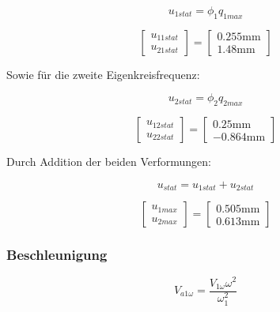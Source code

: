 \documentclass[
  letterpaper,
  DIV=11]{scrreprt}
\begin{document}
\begin{equation*}u_{1 stat} = \phi_{1} q_{1 max}\end{equation*}

\begin{equation*}\left[\begin{matrix}u_{11stat}\\u_{21stat}\end{matrix}\right] = \left[\begin{matrix}0.255 \text{mm}\\1.48 \text{mm}\end{matrix}\right]\end{equation*}

Sowie für die zweite Eigenkreisfrequenz:

\begin{equation*}u_{2 stat} = \phi_{2} q_{2 max}\end{equation*}

\begin{equation*}\left[\begin{matrix}u_{12stat}\\u_{22stat}\end{matrix}\right] = \left[\begin{matrix}0.25 \text{mm}\\- 0.864 \text{mm}\end{matrix}\right]\end{equation*}

Durch Addition der beiden Verformungen:

\begin{equation*}u_{stat} = u_{1 stat} + u_{2 stat}\end{equation*}

\begin{equation*}\left[\begin{matrix}u_{1max}\\u_{2max}\end{matrix}\right] = \left[\begin{matrix}0.505 \text{mm}\\0.613 \text{mm}\end{matrix}\right]\end{equation*}

\hypertarget{beschleunigung}{%
\subsubsection{Beschleunigung}\label{beschleunigung}}

\begin{equation*}V_{a1 \omega} = \frac{V_{1 \omega} \omega^{2}}{\omega_{1}^{2}}\end{equation*}
\end{document}
